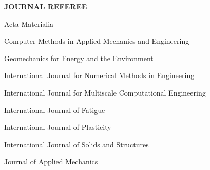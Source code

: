 
\vspace{\sectionskip}
\noindent
{\large \textbf{JOURNAL REFEREE}}
\vspace{\sectionskip}

\begin{minipage}{\minipagewidth}
Acta Materialia
\end{minipage}\vspace{\parskip}

\begin{minipage}{\minipagewidth}
Computer Methods in Applied Mechanics and Engineering
\end{minipage}\vspace{\parskip}

\begin{minipage}{\minipagewidth}
Geomechanics for Energy and the Environment
\end{minipage}\vspace{\parskip}

\begin{minipage}{\minipagewidth}
International Journal for Numerical Methods in Engineering
\end{minipage}\vspace{\parskip}

\begin{minipage}{\minipagewidth}
International Journal for Multiscale Computational Engineering
\end{minipage}\vspace{\parskip}

\begin{minipage}{\minipagewidth}
International Journal of Fatigue
\end{minipage}\vspace{\parskip}

\begin{minipage}{\minipagewidth}
International Journal of Plasticity
\end{minipage}\vspace{\parskip}

\begin{minipage}{\minipagewidth}
International Journal of Solids and Structures
\end{minipage}\vspace{\parskip}

\begin{minipage}{\minipagewidth}
Journal of Applied Mechanics
\end{minipage}\vspace{\parskip}
